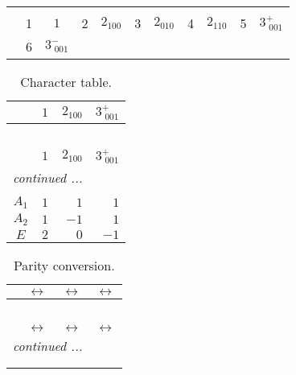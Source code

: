 \documentclass[fleqn,10pt,landscape]{article}
\begin{document}
\begin{itemize}
\begin{center}
\begin{longtable}{c|cc|cc|cc|cc|cc}
 \hline \hline
\multicolumn{10}{r}{} \\ \endlastfoot

 & 1 & $1$ & 2 & $2{}_{100}$ & 3 & $2{}_{010}$ & 4 & $2{}_{110}$ & 5 & $3^{+}_{\,\,001}$ \\
& 6 & $3^{-}_{\,\,001}$ &  &  &  &  &  &  &  &  \\
\end{longtable}
\end{center}
\begin{center}
\renewcommand{\arraystretch}{1.0}
\begin{longtable}{c|rrr}
\caption{Character table.}
 \\
 \hline \hline
 & $ 1 $ & $ 2{}_{100} $ & $ 3^{+}_{\,\,001} $ \\ \hline \endfirsthead

\multicolumn{3}{l}{\tablename\ \thetable{}} \\
 \hline \hline
 & $ 1 $ & $ 2{}_{100} $ & $ 3^{+}_{\,\,001} $ \\ \hline \endhead

 \hline \hline
\multicolumn{3}{r}{\footnotesize\it continued ...} \\ \endfoot

 \hline \hline
\multicolumn{3}{r}{} \\ \endlastfoot

$ A_{1} $ & $ 1 $ & $ 1 $ & $ 1 $ \\
$ A_{2} $ & $ 1 $ & $ -1 $ & $ 1 $ \\
$ E $ & $ 2 $ & $ 0 $ & $ -1 $ \\
\end{longtable}
\end{center}
\begin{center}
\renewcommand{\arraystretch}{1.0}
\begin{longtable}{cccc}
\caption{Parity conversion.}
 \\
 \hline \hline
 & $\leftrightarrow$ & $\leftrightarrow$ & $\leftrightarrow$ \\ \hline \endfirsthead

\multicolumn{3}{l}{\tablename\ \thetable{}} \\
 \hline \hline
 & $\leftrightarrow$ & $\leftrightarrow$ & $\leftrightarrow$ \\ \hline \endhead

 \hline \hline
\multicolumn{3}{r}{\footnotesize\it continued ...} \\ \endfoot

 \hline \hline
\multicolumn{3}{r}{} \\ \endlastfoot


\end{longtable}
\end{center}
\end{itemize}
\end{document}
